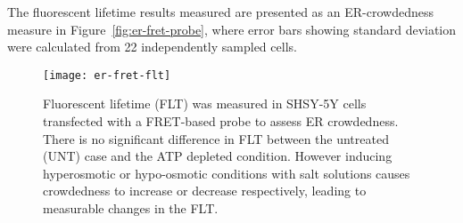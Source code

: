 The fluorescent lifetime results measured are presented as an ER-crowdedness measure in Figure~\ref{fig:er-fret-probe}, where error bars showing standard deviation were calculated from 22 independently sampled cells. 

\begin{figure}[tbp]
\centering
\texttt{[image: er-fret-flt]}
\caption[Measuring fluorescent lifetime of a FRET-based probe is used to assess ER crowdedness]{Fluorescent lifetime (FLT) was measured in SHSY-5Y cells transfected with a FRET-based probe to assess ER crowdedness. There is no significant difference in FLT between the untreated (UNT) case and the ATP depleted condition. However inducing hyperosmotic or hypo-osmotic conditions with salt solutions causes crowdedness to increase or decrease respectively, leading to measurable changes in the FLT. } 
\label{fig:er-fret-flt}
\end{figure}